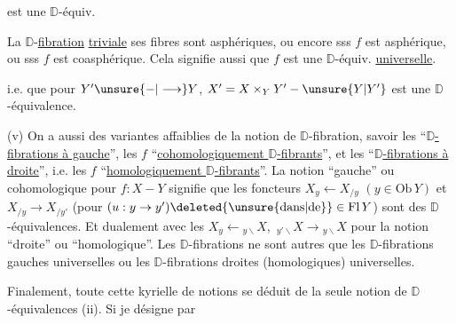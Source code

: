 
est une $\mathbb D$-équiv.


La $\mathbb D$-\uline{fibration}   \uline{triviale}   ses fibres sont asphériques, ou encore sss $f$ est asphérique, ou sss $f$ est coasphérique. Cela signifie aussi que $f$ est une $\mathbb D$-équiv. \uline{universelle}.

i.e.  que pour  $Y'\unsure{-|\longrightarrow}Y$, $X'=X\times_Y Y' - \unsure{Y|Y'}$ est une $\mathbb D$-équivalence.

(v) On a aussi des variantes affaiblies de la notion de $\mathbb D$-fibration, savoir les ``\uline{$\mathbb D$-fibrations à gauche}'', les $f$ ``\uline{cohomologiquement $\mathbb D$-fibrants}'', et les ``\uline{$\mathbb D$-fibrations à droite}'', i.e. les $f$ ``\uline{homologiquement $\mathbb D$-fibrants}''.  La notion ``gauche'' ou cohomologique pour $f:X - Y$ signifie que les foncteurs $X_y\leftarrow X_{/y}$ $(y\in\mathrm{Ob}\,Y)$ et $X_{/y}\longrightarrow X_{/y'}$ (pour $(u:y\to y')\deleted{\unsure{\mathrm{dans}|\mathrm{de}}}\in\mathrm{Fl}\,Y$) sont des $\mathbb D$-équivalences. Et dualement  avec les $X_y\leftarrow {}_{y\backslash}X$, $\,{}_{y'\backslash}X\longrightarrow {}_{y\backslash}X$ pour la notion ``droite'' ou ``homologique''. Les $\mathbb D$-fibrations ne sont autres que les $\mathbb D$-fibrations gauches  universelles ou les $\mathbb D$-fibrations droites (homologiques) universelles.


Finalement, toute cette kyrielle de notions se déduit de la seule notion de $\mathbb D$-équivalences (ii). Si je désigne par

